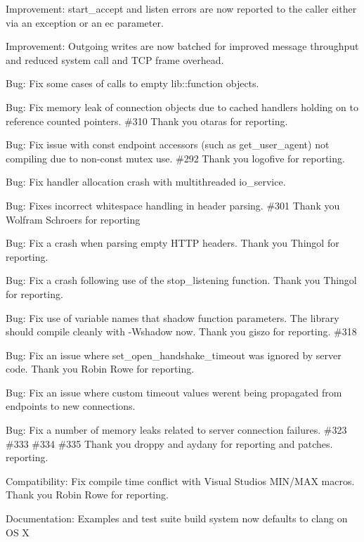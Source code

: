 \begin{DoxyItemize}
\item Improvement\+: {\ttfamily start\+\_\+accept} and {\ttfamily listen} errors are now reported to the caller either via an exception or an ec parameter.
\item Improvement\+: Outgoing writes are now batched for improved message throughput and reduced system call and T\+CP frame overhead.
\item Bug\+: Fix some cases of calls to empty lib\+::function objects.
\item Bug\+: Fix memory leak of connection objects due to cached handlers holding on to reference counted pointers. \#310 Thank you otaras for reporting.
\item Bug\+: Fix issue with const endpoint accessors (such as {\ttfamily get\+\_\+user\+\_\+agent}) not compiling due to non-\/const mutex use. \#292 Thank you logofive for reporting.
\item Bug\+: Fix handler allocation crash with multithreaded {\ttfamily io\+\_\+service}.
\item Bug\+: Fixes incorrect whitespace handling in header parsing. \#301 Thank you Wolfram Schroers for reporting
\item Bug\+: Fix a crash when parsing empty H\+T\+TP headers. Thank you Thingol for reporting.
\item Bug\+: Fix a crash following use of the {\ttfamily stop\+\_\+listening} function. Thank you Thingol for reporting.
\item Bug\+: Fix use of variable names that shadow function parameters. The library should compile cleanly with -\/\+Wshadow now. Thank you giszo for reporting. \#318
\item Bug\+: Fix an issue where {\ttfamily set\+\_\+open\+\_\+handshake\+\_\+timeout} was ignored by server code. Thank you Robin Rowe for reporting.
\item Bug\+: Fix an issue where custom timeout values weren\textquotesingle{}t being propagated from endpoints to new connections.
\item Bug\+: Fix a number of memory leaks related to server connection failures. \#323 \#333 \#334 \#335 Thank you droppy and aydany for reporting and patches. reporting.
\item Compatibility\+: Fix compile time conflict with Visual Studio\textquotesingle{}s M\+I\+N/\+M\+AX macros. Thank you Robin Rowe for reporting.
\item Documentation\+: Examples and test suite build system now defaults to clang on OS X
\end{DoxyItemize}

